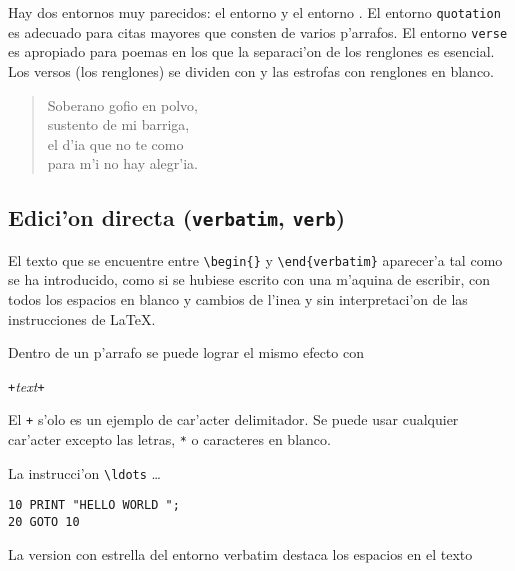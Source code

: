 Hay dos entornos muy parecidos: el entorno  y el entorno
. El entorno \texttt{quotation} es adecuado para citas
mayores que consten de varios p'arrafos. El entorno \texttt{verse} es
apropiado para poemas en los que la separaci'on de los renglones es
esencial. Los versos (los renglones) se dividen con \ci{\bs} y las
estrofas con renglones en blanco.

\begin{example}
\begin{flushleft}
\begin{verse}
Soberano gofio en polvo,\\
sustento de mi barriga,\\
el d'ia que no te como\\
para m'i no hay alegr'ia.
\end{verse}
\end{flushleft}
\end{example}

\subsection{Edici'on directa (\texttt{verbatim}, \texttt{verb})}

El texto que se encuentre entre \verb|\begin{|\verb|}| y
  \verb|\end{verbatim}| aparecer'a tal como se ha introducido, como si
se hubiese escrito con una m'aquina de escribir, con todos los espacios
en blanco y cambios de l'inea y sin interpretaci'on de las
instrucciones de \LaTeX.

Dentro de un p'arrafo se puede lograr el mismo efecto con
\begin{command}
\verb|+|\emph{text}\verb|+|
\end{command}

\noindent El \verb|+| s'olo es un ejemplo de car'acter delimitador. Se
puede usar cualquier car'acter excepto las letras, \verb|*| o
caracteres en blanco.

\begin{example}
La instrucci'on \verb|\ldots|%
\ldots

\begin{verbatim}
10 PRINT "HELLO WORLD ";
20 GOTO 10
\end{verbatim}
\end{example}

\begin{example}
\begin{verbatim*}
La version con estrella del
entorno          verbatim
destaca los espacios     en
el  texto
\end{verbatim*}
\end{example}

